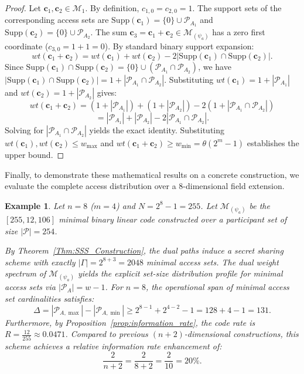 \documentclass[pdflatex,sn-mathphys-num]{sn-jnl}%
\theoremstyle{thmstyleone}%
\theoremstyle{thmstyletwo}%
\newtheorem{example}{Example}%
\theoremstyle{thmstylethree}%
\begin{document}
\begin{proof}
Let $\mathbf{c}_1, \mathbf{c}_2 \in \mathcal{M}_1$. By definition, $c_{1,0} = c_{2,0} = 1$. The support sets of the corresponding access sets are $\text{Supp}(\mathbf{c}_1) = \{0\} \cup \mathcal{P}_{A_1}$ and $\text{Supp}(\mathbf{c}_2) = \{0\} \cup \mathcal{P}_{A_2}$. The sum $\mathbf{c}_3 = \mathbf{c}_1 + \mathbf{c}_2 \in \mathcal{M}_{(\psi_a)}$ has a zero first coordinate ($c_{3,0} = 1 + 1 = 0$). By standard binary support expansion:
\[
wt(\mathbf{c}_1 + \mathbf{c}_2) = wt(\mathbf{c}_1) + wt(\mathbf{c}_2) - 2 |\mathrm{Supp}(\mathbf{c}_1) \cap \mathrm{Supp}(\mathbf{c}_2)|.
\]
Since $\mathrm{Supp}(\mathbf{c}_1) \cap \mathrm{Supp}(\mathbf{c}_2) = \{0\} \cup (\mathcal{P}_{A_1} \cap \mathcal{P}_{A_2})$, we have $|\mathrm{Supp}(\mathbf{c}_1) \cap \mathrm{Supp}(\mathbf{c}_2)| = 1 + |\mathcal{P}_{A_1} \cap \mathcal{P}_{A_2}|$. Substituting $wt(\mathbf{c}_1) = 1 + |\mathcal{P}_{A_1}|$ and $wt(\mathbf{c}_2) = 1 + |\mathcal{P}_{A_2}|$ gives:
\[
wt(\mathbf{c}_1 + \mathbf{c}_2) = (1 + |\mathcal{P}_{A_1}|) + (1 + |\mathcal{P}_{A_2}|) - 2(1 + |\mathcal{P}_{A_1} \cap \mathcal{P}_{A_2}|)
\]
\[
= |\mathcal{P}_{A_1}| + |\mathcal{P}_{A_2}| - 2|\mathcal{P}_{A_1} \cap \mathcal{P}_{A_2}|.
\]
Solving for $|\mathcal{P}_{A_1} \cap \mathcal{P}_{A_2}|$ yields the exact identity. Substituting $wt(\mathbf{c}_1), wt(\mathbf{c}_2) \le w_{\max}$ and $wt(\mathbf{c}_1 + \mathbf{c}_2) \ge w_{\min} = \theta(2^m-1)$ establishes the upper bound.
\end{proof}

Finally, to demonstrate these mathematical results on a concrete construction, we evaluate the complete access distribution over a 8-dimensional field extension.

\begin{example}
Let $n = 8$ ($m = 4$) and $N = 2^8 - 1 = 255$. Let $\mathcal{M}_{(\psi_a)}$ be the $[255, 12, 106]$ minimal binary linear code constructed over a participant set of size $|\mathcal{P}| = 254$.

By Theorem~\ref{Thm:SSS_Construction}, the dual paths induce a secret sharing scheme with exactly $|\Gamma| = 2^{8+3} = 2048$ minimal access sets. The dual weight spectrum of $\mathcal{M}_{(\psi_a)}$ yields the explicit set-size distribution profile for minimal access sets via $|\mathcal{P}_A| = w - 1$. For $n = 8$, the operational span of minimal access set cardinalities satisfies:
\[
\Delta = |\mathcal{P}_{A,\max}| - |\mathcal{P}_{A,\min}| \ge 2^{8-1} + 2^{4-2} - 1 = 128 + 4 - 1 = 131.
\]
Furthermore, by Proposition~\ref{prop:information_rate}, the code rate is $R = \frac{12}{255} \approx 0.0471$. Compared to previous $(n+2)$-dimensional constructions, this scheme achieves a relative information rate enhancement of:
\[
\frac{2}{n+2} = \frac{2}{8+2} = \frac{2}{10} = 20\%.
\]
\end{example}
\end{document}

